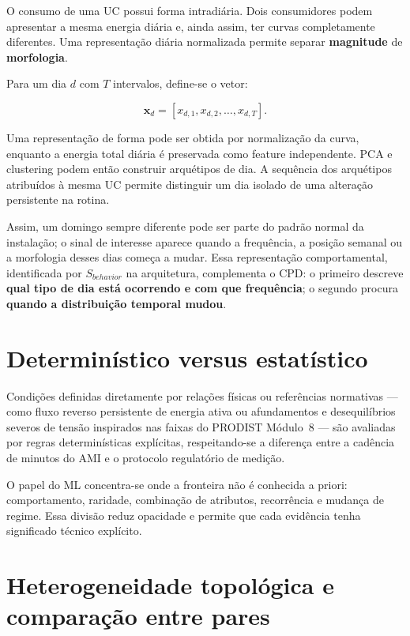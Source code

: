 O consumo de uma UC possui forma intradiária. Dois consumidores podem apresentar a mesma energia diária e, ainda assim, ter curvas completamente diferentes. Uma representação diária normalizada permite separar \textbf{magnitude} de \textbf{morfologia}.

Para um dia \(d\) com \(T\) intervalos, define-se o vetor:

\[\mathbf{x}_d=[x_{d,1},x_{d,2},\ldots,x_{d,T}].\]

Uma representação de forma pode ser obtida por normalização da curva, enquanto a energia total diária é preservada como feature independente. PCA e clustering podem então construir arquétipos de dia. A sequência dos arquétipos atribuídos à mesma UC permite distinguir um dia isolado de uma alteração persistente na rotina.

Assim, um domingo sempre diferente pode ser parte do padrão normal da instalação; o sinal de interesse aparece quando a frequência, a posição semanal ou a morfologia desses dias começa a mudar. Essa representação comportamental, identificada por \(S_{behavior}\) na arquitetura, complementa o CPD: o primeiro descreve \textbf{qual tipo de dia está ocorrendo e com que frequência}; o segundo procura \textbf{quando a distribuição temporal mudou}.

\section{Determinístico versus estatístico}\label{determinuxedstico-versus-estatuxedstico}

Condições definidas diretamente por relações físicas ou referências normativas --- como fluxo reverso persistente de energia ativa ou afundamentos e desequilíbrios severos de tensão inspirados nas faixas do PRODIST Módulo~8 \autocite{aneel2026} --- são avaliadas por regras determinísticas explícitas, respeitando-se a diferença entre a cadência de minutos do AMI e o protocolo regulatório de medição.

O papel do ML concentra-se onde a fronteira não é conhecida a priori: comportamento, raridade, combinação de atributos, recorrência e mudança de regime. Essa divisão reduz opacidade e permite que cada evidência tenha significado técnico explícito.

\section{Heterogeneidade topológica e comparação entre pares}\label{heterogeneidade-topoluxf3gica-e-comparauxe7uxe3o-entre-pares}

